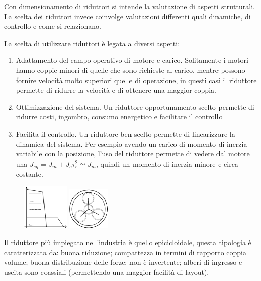 Con dimensionamento di riduttori si intende la valutazione di aspetti strutturali. La scelta dei riduttori invece coinvolge valutazioni differenti quali dinamiche, di controllo e come si relazionano.

La scelta di utilizzare riduttori è legata a diversi aspetti:
\begin{enumerate}
    \item Adattamento del campo operativo di motore e carico. Solitamente i motori hanno coppie minori di quelle che sono richieste al carico, mentre possono fornire velocità molto superiori quelle di operazione, in questi casi il riduttore permette di ridurre la velocità e di ottenere una maggior coppia.
    \item Ottimizzazione del sistema. Un riduttore opportunamento scelto permette di ridurre costi, ingombro, consumo energetico e facilitare il controllo
    \item Facilita il controllo. Un riduttore ben scelto permette di linearizzare la dinamica del sistema. Per esempio avendo un carico di momento di inerzia variabile con la posizione, l'uso del riduttore permette di vedere dal motore una $J_{eq}=J_m+J_c\tau_r^2\simeq J_m$, quindi un momento di inerzia minore e circa costante.  
\end{enumerate}

\begin{figure}[h]
    \centering
    \includegraphics[width=0.2\textwidth]{Immagini/campo_operativo_riduttore.png}
    \includegraphics[width=0.18\textwidth,angle=-5]{Immagini/riduttore_epicicloidale.png}
\end{figure}

Il riduttore più impiegato nell'industria è quello epicicloidale, questa tipologia è caratterizzata da: buona riduzione; compattezza in termini di rapporto coppia volume; buona distribuzione delle forze; non è invertente; alberi di ingresso e uscita sono coassiali (permettendo una maggior facilità di layout).

